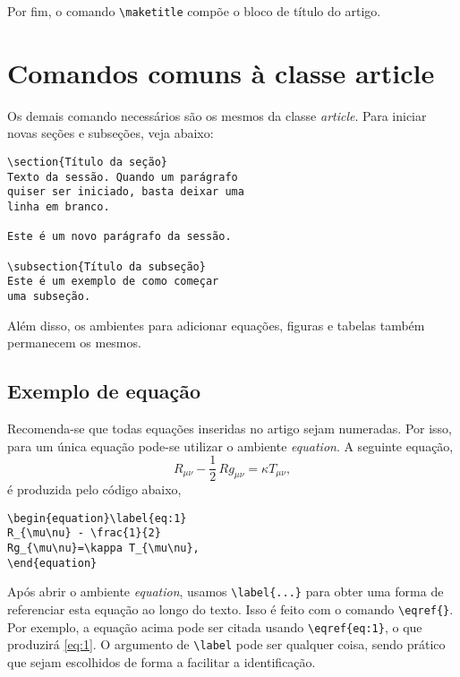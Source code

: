 \documentclass{article}
\begin{document}
Por fim, o comando \verb|\maketitle| compõe o bloco de título do artigo.


\section{Comandos comuns à classe article}
Os demais comando necessários são os mesmos da classe \textit{article}. Para iniciar novas seções e subseções, veja abaixo:

\begin{verbatim}
\section{Título da seção}
Texto da sessão. Quando um parágrafo
quiser ser iniciado, basta deixar uma
linha em branco.

Este é um novo parágrafo da sessão.

\subsection{Título da subseção}
Este é um exemplo de como começar
uma subseção.
\end{verbatim}

Além disso, os ambientes para adicionar equações, figuras e tabelas também permanecem os mesmos.

\subsection{Exemplo de equação}
Recomenda-se que todas equações inseridas no artigo sejam numeradas. Por isso, para um única equação pode-se utilizar o ambiente \textit{equation}. A seguinte equação,
\begin{equation}\label{eq:1}
 R_{\mu\nu} - \frac{1}{2}\,Rg_{\mu\nu}=\kappa T_{\mu\nu},
\end{equation}
é produzida pelo código abaixo,
\begin{verbatim}
\begin{equation}\label{eq:1}
R_{\mu\nu} - \frac{1}{2}
Rg_{\mu\nu}=\kappa T_{\mu\nu},
\end{equation}
\end{verbatim}
Após abrir o ambiente \textit{equation}, usamos \verb|\label{...}| para obter uma forma de referenciar esta equação ao longo do texto. Isso é feito com o comando \verb|\eqref{}|. Por exemplo, a equação acima pode ser citada usando \verb|\eqref{eq:1}|, o que produzirá \eqref{eq:1}. O argumento de \verb|\label| pode ser qualquer coisa, sendo prático que sejam escolhidos de forma a facilitar a identificação.
\end{document}
